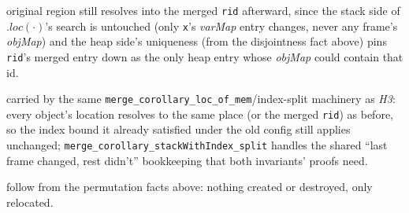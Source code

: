 \documentclass[11pt]{article}
\newcommand{\op}[1]{\texttt{#1}}
\begin{document}
\begin{description}[nosep]
    original region still resolves into the merged \op{rid} afterward, since the stack side of
    $.loc(\cdot)$'s search is untouched (only \texttt{x}'s \textit{varMap} entry changes, never any
    frame's \textit{objMap}) and the heap side's uniqueness (from the disjointness fact above)
    pins \op{rid}'s merged entry down as the only heap entry whose \textit{objMap} could contain
    that id.
  \item[S2, S3] carried by the same \texttt{merge\_corollary\_loc\_of\_mem}/index-split machinery
    as \textit{H3}: every object's location resolves to the same place (or the merged \op{rid}) as
    before, so the index bound it already satisfied under the old config still applies unchanged;
    \texttt{merge\_corollary\_stackWithIndex\_split} handles the shared ``last frame changed, rest
    didn't'' bookkeeping that both invariants' proofs need.
  \item[HS1, HS2] follow from the permutation facts above: nothing created or destroyed, only
    relocated.
\end{description}
\end{document}
